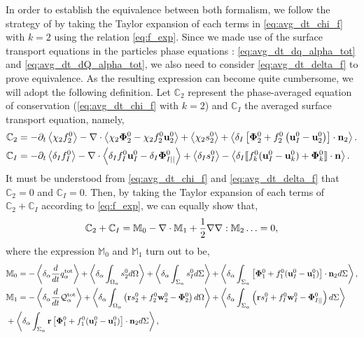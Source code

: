 In order to establish the equivalence between both formalism, we follow the strategy of \citep{lhuillier2000bilan,lhuillier2009rheology} by taking the Taylor expansion of each terms in \ref{eq:avg_dt_chi_f} with $k=2$ using the relation \ref{eq:f_exp}. 
Since we made use of the surface transport equations in the particles phase equations : \ref{eq:avg_dt_dq_alpha_tot} and \ref{eq:avg_dt_dQ_alpha_tot}, we also need to consider \ref{eq:avg_dt_delta_f}  to prove equivalence. 
As the resulting expression can become quite cumbersome, we will adopt the following definition. 
Let $\mathbb{C}_2$ represent the phase-averaged equation of conservation (\ref{eq:avg_dt_chi_f} with $k=2$) and $\mathbb{C}_I$ the averaged surface transport equation, namely, 
\begin{align*}
    \mathbb{C}_2
    &=
    - \partial_t \left<\chi_2f_2^0\right>
    - \mathbf{\nabla}\cdot \left<\chi_2 \mathbf{\Phi}_2^0 - \chi_2f_2^0 \textbf{u}_2^0\right>
    + \left<\chi_2 s_2^0\right>
    + \left<\delta_I\left[
        \mathbf{\Phi}_2^0
        + f_2^0
        \left(
            \textbf{u}_I^0
            - \textbf{u}_2^0
        \right)
    \right]
    \cdot \textbf{n}_2\right>.\\
    \mathbb{C}_I
    &= 
    -\partial_t \left<\delta_If_I^0\right>
    -\mathbf{\nabla}\cdot \left<\delta_I f_I^0 \textbf{u}_I^0-\delta_I \mathbf{\Phi}_{I||}^0 \right>
    + \left<\delta_Is_I^0\right> 
    - \left<\delta_I \llbracket 
    f_k^0 (\textbf{u}_I^0 - \textbf{u}_k^0)
    + \mathbf{\Phi}_k^0
     \rrbracket \cdot \textbf{n} \right>. 
\end{align*}
It must be understood from \ref{eq:avg_dt_chi_f} and \ref{eq:avg_dt_delta_f} that $\mathbb{C}_2=0$ and $\mathbb{C}_I=0$.
Then, by taking the Taylor expansion of each terms of $\mathbb{C}_2+\mathbb{C}_I$ according to \ref{eq:f_exp}, we can equally show that,
\begin{equation}
    \mathbb{C}_2 
    + \mathbb{C}_I 
    = \mathbb{M}_0 - \mathbf{\nabla}\cdot \mathbb{M}_1 + \frac{1}{2} \mathbf{\nabla}\mathbf{\nabla} : \mathbb{M}_2 \ldots = 0,
    \label{eq:scheme_equivalence}
\end{equation} 
where the expression $\mathbb{M}_0$ and $\mathbb{M}_1$ turn out to be, 
\begin{align*}
    &\mathbb{M}_0
    = 
    - \left<\delta_\alpha \frac{d}{d t} q_\alpha^\text{tot}\right>
    + \left<\delta_\alpha\int_{\Omega_\alpha} s_2^0 d\Omega\right>
    + \left<\delta_\alpha\int_{\Sigma_\alpha} s_I^0 d\Sigma\right>
    + \left<\delta_\alpha\int_{\Sigma_\alpha} 
    \left[\mathbf{\Phi}_1^0 
    + f_1^0 (\textbf{u}_I^0-\textbf{u}_1^0) \right] \cdot \textbf{n}_2 d\Sigma\right>,\\
    &\mathbb{M}_1 =
    -  \left<\delta_\alpha \frac{d}{d t} \mathcal{Q}_\alpha^\text{tot}\right>
     + \left<\delta_\alpha\int_{\Omega_\alpha} \left(
        \textbf{r} s_2^0         
        + f_2^0  \textbf{w}_2^0 
        - \mathbf{\Phi}_2^0
    \right) d\Omega\right>
    + \left<\delta_\alpha\int_{\Sigma_\alpha} \left(
        \textbf{r}s_I^0
        + f_I^0 \textbf{w}_I^0
        - \mathbf{\Phi}_{I||}^0
    \right) d\Sigma\right>\\
    &+ \left<\delta_\alpha\int_{\Sigma_\alpha} \textbf{r} \left[
        \mathbf{\Phi}_1^0
        + f_1^0 (\textbf{u}_I^0-\textbf{u}_1^0)
    \right]\cdot \textbf{n}_2  d\Sigma\right>,
\end{align*}
